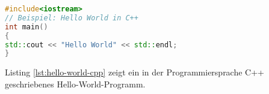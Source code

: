 \documentclass[12pt,a4paper]{scrbook}
\begin{document}
	
\begin{lstlisting}[language={c++}, caption={Hello World in C++}, captionpos=b, label=lst:hello-world-cpp]
#include<iostream>
// Beispiel: Hello World in C++
int main() 
{
std::cout << "Hello World" << std::endl;
}
\end{lstlisting}

Listing \ref{lst:hello-world-cpp} zeigt ein in der Programmiersprache C++ geschriebenes Hello-World-Programm.
\end{document}
